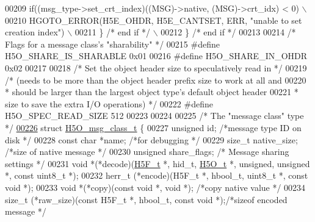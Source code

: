 \begin{DoxyCode}
00209 \textcolor{preprocessor}{            if((msg\_type->set\_crt\_index)((MSG)->native, (MSG)->crt\_idx) < 0)  \(\backslash\)}
00210 \textcolor{preprocessor}{                HGOTO\_ERROR(H5E\_OHDR, H5E\_CANTSET, ERR, "unable to set creation index") \(\backslash\)}
00211 \textcolor{preprocessor}{        \} }\textcolor{comment}{/* end if */}\textcolor{preprocessor}{                                \(\backslash\)}
00212 \textcolor{preprocessor}{    \} }\textcolor{comment}{/* end if */}\textcolor{preprocessor}{}
00213 
00214 \textcolor{comment}{/* Flags for a message class's "sharability" */}
00215 \textcolor{preprocessor}{#define H5O\_SHARE\_IS\_SHARABLE   0x01}
00216 \textcolor{preprocessor}{#define H5O\_SHARE\_IN\_OHDR       0x02}
00217 
00218 \textcolor{comment}{/* Set the object header size to speculatively read in */}
00219 \textcolor{comment}{/* (needs to be more than the object header prefix size to work at all and}
00220 \textcolor{comment}{ *      should be larger than the largest object type's default object header}
00221 \textcolor{comment}{ *      size to save the extra I/O operations) */}
00222 \textcolor{preprocessor}{#define H5O\_SPEC\_READ\_SIZE 512}
00223 
00224 
00225 \textcolor{comment}{/* The "message class" type */}
\hyperlink{struct_h5_o__msg__class__t}{00226} \textcolor{keyword}{struct }\hyperlink{struct_h5_o__msg__class__t}{H5O\_msg\_class\_t} \{
00227     \textcolor{keywordtype}{unsigned}    id;             \textcolor{comment}{/*message type ID on disk   */}
00228     \textcolor{keyword}{const} \textcolor{keywordtype}{char}  *name;              \textcolor{comment}{/*for debugging             */}
00229     \textcolor{keywordtype}{size\_t}  native\_size;            \textcolor{comment}{/*size of native message    */}
00230     \textcolor{keywordtype}{unsigned}    share\_flags;            \textcolor{comment}{/* Message sharing settings */}
00231     \textcolor{keywordtype}{void}    *(*decode)(\hyperlink{struct_h5_f__t}{H5F\_t} *, hid\_t, \hyperlink{struct_h5_o__t}{H5O\_t} *, unsigned, \textcolor{keywordtype}{unsigned} *, \textcolor{keyword}{const} uint8\_t *);
00232     herr\_t  (*encode)(H5F\_t *, hbool\_t, uint8\_t *, \textcolor{keyword}{const} \textcolor{keywordtype}{void} *);
00233     \textcolor{keywordtype}{void}    *(*copy)(\textcolor{keyword}{const} \textcolor{keywordtype}{void} *, \textcolor{keywordtype}{void} *); \textcolor{comment}{/*copy native value         */}
00234     size\_t  (*raw\_size)(\textcolor{keyword}{const} H5F\_t *, hbool\_t, \textcolor{keyword}{const} \textcolor{keywordtype}{void} *);\textcolor{comment}{/*sizeof encoded message  */}

\end{DoxyCode}
